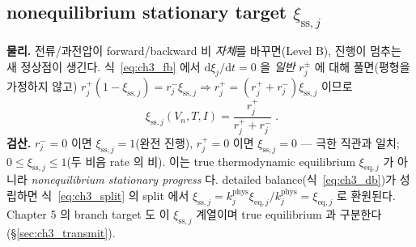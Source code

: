 \documentclass[11pt,a4paper]{article}
\newcommand{\dd}{\mathrm{d}}
\newcommand{\eq}{\mathrm{eq}}
\newcommand{\sstat}{\mathrm{ss}}
\begin{document}
\subsection{nonequilibrium stationary target $\xi_{\sstat,j}$}\label{sec:ch3_xiss}
\textbf{물리.} 전류/과전압이 forward/backward 비 \emph{자체}를 바꾸면(Level B), 진행이 멈추는 새 정상점이
생긴다. 식~\eqref{eq:ch3_fb} 에서 $\dd\xi_j/\dd t=0$ 을 \emph{일반} $r_j^\pm$ 에 대해 풀면(평형을 가정하지 않고)
$r_j^+(1-\xi_{\sstat,j})=r_j^-\xi_{\sstat,j}\Rightarrow r_j^+=(r_j^++r_j^-)\xi_{\sstat,j}$ 이므로
\begin{equation}
\boxed{\;\xi_{\sstat,j}(V_n,T,I)=\frac{r_j^+}{r_j^++r_j^-}\;.}
\label{eq:ch3_xiss}
\end{equation}
\textbf{검산.} $r_j^-=0$ 이면 $\xi_{\sstat,j}=1$(완전 진행), $r_j^+=0$ 이면 $\xi_{\sstat,j}=0$ — 극한 직관과 일치;
$0\le\xi_{\sstat,j}\le1$(두 비음 rate 의 비). 이는 true thermodynamic equilibrium $\xi_{\eq,j}$ 가 아니라
\emph{nonequilibrium stationary progress} 다. detailed balance(식~\eqref{eq:ch3_db})가 성립하면 식~\eqref{eq:ch3_split}
의 split 에서 $\xi_{\sstat,j}=k_j^{\mathrm{phys}}\xi_{\eq,j}/k_j^{\mathrm{phys}}=\xi_{\eq,j}$ 로 환원된다. Chapter 5
의 branch target 도 이 $\xi_{\sstat,j}$ 계열이며 true equilibrium 과 구분한다(\S\ref{sec:ch3_transmit}).

\end{document}
